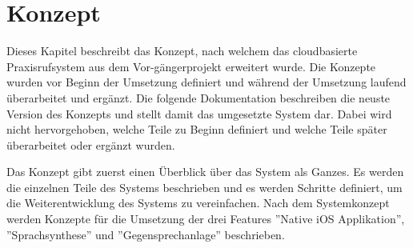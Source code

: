 \section{Konzept}

Dieses Kapitel beschreibt das Konzept, nach welchem das cloudbasierte Praxisrufsystem aus dem Vor-gängerprojekt erweitert wurde.
Die Konzepte wurden vor Beginn der Umsetzung definiert und während der Umsetzung laufend überarbeitet und ergänzt.
Die folgende Dokumentation beschreiben die neuste Version des Konzepts und stellt damit das umgesetzte System dar.
Dabei wird nicht hervorgehoben, welche Teile zu Beginn definiert und welche Teile später überarbeitet oder ergänzt wurden.

Das Konzept gibt zuerst einen Überblick über das System als Ganzes.
Es werden die einzelnen Teile des Systems beschrieben und es werden Schritte definiert, um die Weiterentwicklung des Systems zu vereinfachen.
Nach dem Systemkonzept werden Konzepte für die Umsetzung der drei Features ''Native iOS Applikation'', ''Sprachsynthese'' und ''Gegensprechanlage'' beschrieben.





